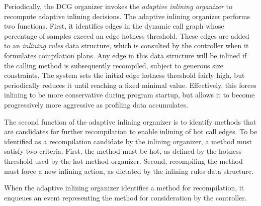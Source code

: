 Periodically, the DCG organizer invokes the {\em adaptive inlining
organizer} to recompute adaptive inlining decisions.  The adaptive
inlining organizer performs two functions.  First,
it identifies edges in
the dynamic call graph whose percentage of samples exceed an edge
hotness threshold. 
These edges are added to an {\em inlining rules} data structure,
which is consulted by the controller when it formulates
compilation plans.  Any edge in this data structure
will be inlined if the calling method is subsequently recompiled,
subject to generous size constraints.
The system sets the initial edge hotness threshold 
fairly high, but periodically reduces it until reaching a
fixed minimal value.  Effectively, this forces 
inlining to be more conservative 
during program startup, but allows it to become progressively more
aggressive as profiling data accumulates. 

The second function of the adaptive inlining organizer is to identify
methods that are candidates for further recompilation to enable
inlining of hot call edges. To be identified as a recompilation
candidate by the inlining organizer, a method must satisfy two
criteria.  First, the method must be hot, as defined by the hotness
threshold used by the hot method organizer.  Second, recompiling
the method must force a new inlining action, as dictated by the 
inlining rules data structure.

When the adaptive inlining organizer identifies a method for recompilation,
it enqueues an event representing the method for consideration by the
controller.  

